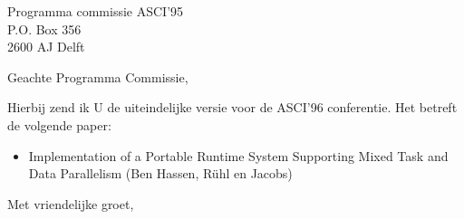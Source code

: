 


\begin{letter}{
    Programma commissie ASCI'95\\
    P.O. Box 356\\
    2600 AJ Delft
}
    
\signature{Tim R\"uhl}

\opening{Geachte Programma Commissie,}

Hierbij zend ik U de uiteindelijke versie voor de ASCI'96
conferentie. Het betreft de volgende paper:

\begin{itemize}
\item Implementation of a Portable Runtime System Supporting Mixed
  Task and Data Parallelism (Ben Hassen, R\"uhl en Jacobs)
\end{itemize}

\closing{Met vriendelijke groet,}

\end{letter}




